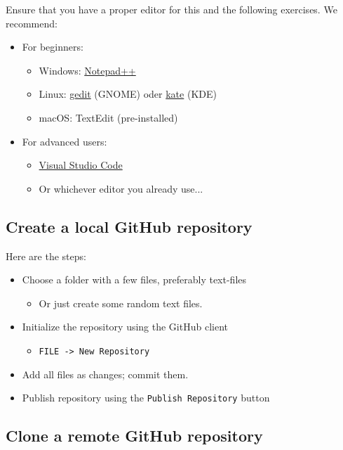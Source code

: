 \documentclass[paper=a4]{scrartcl}
\begin{document}
Ensure that you have a proper editor for this and the following exercises. We recommend:

\newpage

\begin{itemize}
  \item For beginners:
    \begin{itemize}
      \item Windows: \href{https://notepad-plus-plus.org/}{Notepad++}
      \item Linux: \href{https://wiki.gnome.org/Apps/Gedit}{gedit} (GNOME) oder \href{https://kate-editor.org/}{kate} (KDE)
      \item macOS: TextEdit (pre-installed)
    \end{itemize}
  \item For advanced users:
    \begin{itemize}
      \item \href{https://code.visualstudio.com/}{Visual Studio Code}
      \item Or whichever editor you already use...
    \end{itemize}
\end{itemize}


\subsection*{Create a local GitHub repository}

Here are the steps:
\begin{itemize}
  \item Choose a folder with a few files, preferably text-files
    \begin{itemize}
      \item Or just create some random text files.
    \end{itemize}
  \item Initialize the repository using the GitHub client
    \begin{itemize}
      \item \texttt{FILE -> New Repository}
    \end{itemize}
  \item Add all files as changes; commit them.
  \item Publish repository using the \texttt{Publish Repository} button
\end{itemize}

\subsection*{Clone a remote GitHub repository}
\end{document}
